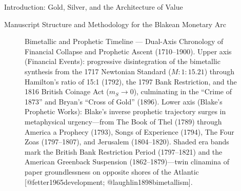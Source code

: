 \documentclass[
  ignorenonframetext,
]{beamer}
\makeatletter
\newcommand*\pandocbounded[1]{%
  \sbox\pandoc@box{#1}%
  \Gscale@div\@tempa{\textheight}{\dimexpr\ht\pandoc@box+\dp\pandoc@box\relax}%
  \Gscale@div\@tempb{\linewidth}{\wd\pandoc@box}%
  \ifdim\@tempb\p@<\@tempa\p@\let\@tempa\@tempb\fi%
  \ifdim\@tempa\p@<\p@\scalebox{\@tempa}{\usebox\pandoc@box}%
  \else\usebox{\pandoc@box}%
  \fi%
}
\makeatother
\begin{document}
\begin{frame}{Introduction: Gold, Silver, and the Architecture of Value}
\begin{block}{Manuscript Structure and Methodology for the Blakean
Monetary Arc}
\begin{figure}
\centering
\pandocbounded{\includegraphics[keepaspectratio,alt={Bimetallic and Prophetic Timeline --- Dual-Axis Chronology of Financial Collapse and Prophetic Ascent (1710--1900). Upper axis (Financial Events): progressive disintegration of the bimetallic synthesis from the 1717 Newtonian Standard (M: 1:15.21) through Hamilton's ratio of 15:1 (1792), the 1797 Bank Restriction, and the 1816 British Coinage Act (m\_S \textbackslash to 0), culminating in the ``Crime of 1873'' and Bryan's ``Cross of Gold'' (1896). Lower axis (Blake's Prophetic Works): Blake's inverse prophetic trajectory surges in metaphysical urgency---from The Book of Thel (1789) through America a Prophecy (1793), Songs of Experience (1794), The Four Zoas (1797--1807), and Jerusalem (1804--1820). Shaded era bands mark the British Bank Restriction Period (1797--1821) and the American Greenback Suspension (1862--1879)---twin clinamina of paper groundlessness on opposite shores of the Atlantic {[}@fetter1965development; @laughlin1898bimetallism{]}.}]{../output/figures/timeline_dark.pdf}}
\caption{Bimetallic and Prophetic Timeline --- Dual-Axis Chronology of
Financial Collapse and Prophetic Ascent (1710--1900). Upper axis
(Financial Events): progressive disintegration of the bimetallic
synthesis from the 1717 Newtonian Standard (\(M: 1:15.21\)) through
Hamilton's ratio of 15:1 (1792), the 1797 Bank Restriction, and the 1816
British Coinage Act (\(m_S \to 0\)), culminating in the ``Crime of
1873'' and Bryan's ``Cross of Gold'' (1896). Lower axis (Blake's
Prophetic Works): Blake's inverse prophetic trajectory surges in
metaphysical urgency---from The Book of Thel (1789) through America a
Prophecy (1793), Songs of Experience (1794), The Four Zoas (1797--1807),
and Jerusalem (1804--1820). Shaded era bands mark the British Bank
Restriction Period (1797--1821) and the American Greenback Suspension
(1862--1879)---twin clinamina of paper groundlessness on opposite shores
of the Atlantic {[}@fetter1965development;
@laughlin1898bimetallism{]}.}\label{fig-timeline}
\end{figure}
\end{block}
\end{frame}
\end{document}
